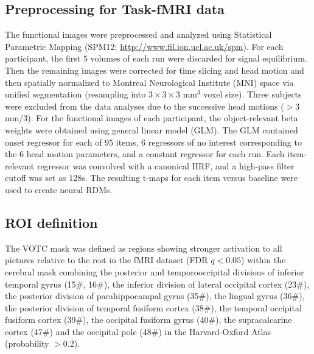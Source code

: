 \documentclass[pdflatex,sn-mathphys-num,lineno]{sn-jnl}%
\begin{document}
\begin{CJK}{UTF8}{gbsn}
\subsection{Preprocessing for Task-fMRI data}
The functional images were preprocessed and analyzed using Statistical Parametric Mapping (SPM12; \url{http://www.fil.ion.ucl.ac.uk/spm}). For each participant, the first $5$ volumes of each run were discarded for signal equilibrium. Then the remaining images were corrected for time slicing and head motion and then spatially normalized to Montreal Neurological Institute (MNI) space via unified segmentation (resampling into $3\times3\times3$ mm$^3$ voxel size). Three subjects were excluded from the data analyses due to the successive head motions ($>3$ mm/$3$\textdegree). For the functional images of each participant, the object-relevant beta weights were obtained using general linear model (GLM). The GLM contained onset regressor for each of $95$ items, $6$ regressors of no interest corresponding to the $6$ head motion parameters, and a constant regressor for each run. Each item-relevant regressor was convolved with a canonical HRF, and a high-pass filter cutoff was set as $128$s. The resulting t-maps for each item versus baseline were used to create neural RDMs.

\subsection{ROI definition}
The VOTC mask was defined as regions showing stronger activation to all pictures relative to the rest in the fMRI dataset (FDR $q < 0.05$) within the cerebral mask combining the posterior and temporooccipital divisions of inferior temporal gyrus (15\#, 16\#), the inferior division of lateral occipital cortex (23\#), the posterior division of parahippocampal gyrus (35\#), the lingual gyrus (36\#), the posterior division of temporal fusiform cortex (38\#), the temporal occipital fusiform cortex (39\#), the occipital fusiform gyrus (40\#), the supracalcarine cortex (47\#) and the occipital pole (48\#) in the Harvard-Oxford Atlas (probability $> 0.2$).


\end{CJK}
\end{document}
